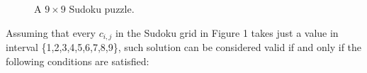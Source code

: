 \documentclass[]{usiinfprospectus}
\newcounter{row}
\newcounter{col}
\newcommand\setrow[9]{
  \setcounter{col}{1}
  \foreach \n in {#1, #2, #3, #4, #5, #6, #7, #8, #9} {
    \edef\x{\value{col} - 0.5}
    \edef\y{9.5 - \value{row}}
    \node[anchor=center] at (\x, \y) {\n};
    \stepcounter{col}
  }
  \stepcounter{row}
}
\begin{document}
\begin{figure}[h]
\begin{center}
\end{center}
\caption{A $9\times 9$ Sudoku puzzle.}
\end{figure}
\noindent
Assuming that every $c_{i,j}$ in the Sudoku grid in Figure 1 takes just a value in interval \{1,2,3,4,5,6,7,8,9\}, such solution can be considered valid if and only if the following conditions are satisfied:
\end{document}
